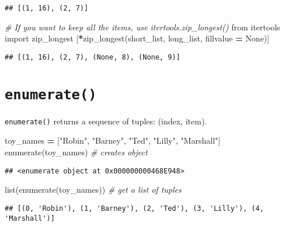 \documentclass[
]{book}
\newenvironment{Shaded}{\begin{snugshade}}{\end{snugshade}}
\newcommand{\BuiltInTok}[1]{#1}
\newcommand{\CommentTok}[1]{\textcolor[rgb]{0.56,0.35,0.01}{\textit{#1}}}
\newcommand{\ImportTok}[1]{#1}
\newcommand{\NormalTok}[1]{#1}
\newcommand{\OperatorTok}[1]{\textcolor[rgb]{0.81,0.36,0.00}{\textbf{#1}}}
\newcommand{\StringTok}[1]{\textcolor[rgb]{0.31,0.60,0.02}{#1}}
\newcommand{\VariableTok}[1]{\textcolor[rgb]{0.00,0.00,0.00}{#1}}
\begin{document}
\begin{verbatim}
## [(1, 16), (2, 7)]
\end{verbatim}

\begin{Shaded}
\begin{Highlighting}[]
\CommentTok{\# If you want to keep all the items, use itertools.zip\_longest()}
\ImportTok{from}\NormalTok{ itertools }\ImportTok{import}\NormalTok{ zip\_longest}
\NormalTok{[}\OperatorTok{*}\NormalTok{zip\_longest(short\_list, long\_list, fillvalue }\OperatorTok{=} \VariableTok{None}\NormalTok{)]}
\end{Highlighting}
\end{Shaded}

\begin{verbatim}
## [(1, 16), (2, 7), (None, 8), (None, 9)]
\end{verbatim}

\hypertarget{enumerate}{%
\section{\texorpdfstring{\texttt{enumerate()}}{enumerate()}}\label{enumerate}}

\texttt{enumerate()} returns a sequence of tuples: (index, item).

\begin{Shaded}
\begin{Highlighting}[]
\NormalTok{toy\_names }\OperatorTok{=}\NormalTok{ [}\StringTok{"Robin"}\NormalTok{, }\StringTok{"Barney"}\NormalTok{, }\StringTok{"Ted"}\NormalTok{, }\StringTok{"Lilly"}\NormalTok{, }\StringTok{"Marshall"}\NormalTok{]}
\BuiltInTok{enumerate}\NormalTok{(toy\_names) }\CommentTok{\# creates object}
\end{Highlighting}
\end{Shaded}

\begin{verbatim}
## <enumerate object at 0x000000000468E948>
\end{verbatim}

\begin{Shaded}
\begin{Highlighting}[]
\BuiltInTok{list}\NormalTok{(}\BuiltInTok{enumerate}\NormalTok{(toy\_names)) }\CommentTok{\# get a list of tuples}
\end{Highlighting}
\end{Shaded}

\begin{verbatim}
## [(0, 'Robin'), (1, 'Barney'), (2, 'Ted'), (3, 'Lilly'), (4, 'Marshall')]
\end{verbatim}
\end{document}
